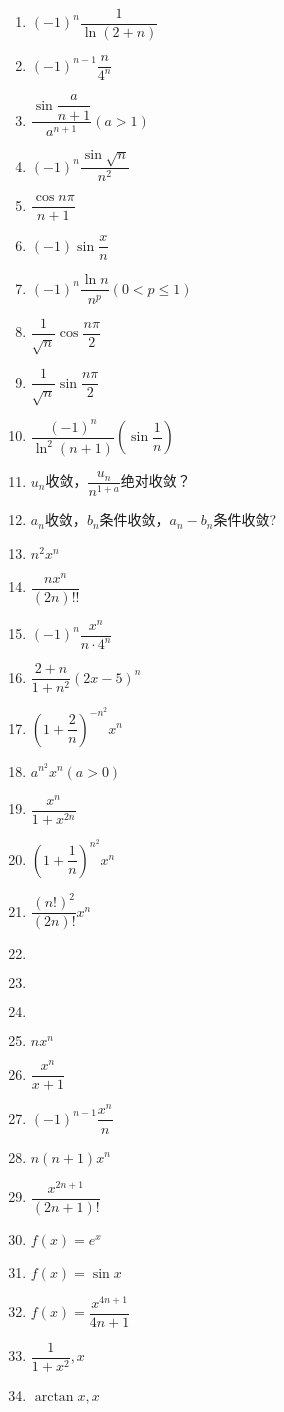 \documentclass[UTF8,a4paper,12pt,scheme=chinese]{ctexart}
\begin{document}
\begin{enumerate}
	\item 	$ (-1)^n\dfrac{1}{\ln(2+n)} $
	\item 	$ (-1)^{n-1}\dfrac{n}{4^n} $
	\item 	$ \dfrac{\sin\dfrac{a}{n+1}}{a^{n+1}}(a>1) $
	\item 	$ (-1)^n\dfrac{\sin\sqrt{n}}{n^2} $
	\item 	$ \dfrac{\cos n \pi}{n+1} $
	\item 	$ (-1)\sin\dfrac{x}{n} $
	\item 	$ (-1)^n\dfrac{\ln n}{n^p}(0<p\leq1) $
	\item 	$ \dfrac{1}{\sqrt{n}}\cos\dfrac{n\pi}{2} $
	\item 	$ \dfrac{1}{\sqrt{n}}\sin\dfrac{n\pi}{2} $
	\item 	$ \dfrac{(-1)^n}{\ln^2(n+1)}(\sin\dfrac{1}{n}) $
	\item 	$ u_n $收敛，$ \dfrac{u_n}{n^{1+a}} $绝对收敛？
	\item 	$ a_n $收敛，$ b_n $条件收敛，$ a_n-b_n $条件收敛?
	\item 	$ n^2x^n $
	\item 	$ \dfrac{nx^n}{(2n)!!} $
	\item 	$ (-1)^n\dfrac{x^n}{n\cdot4^n} $
	\item 	$ \dfrac{2+n}{1+n^2}(2x-5)^n $
	\item 	$ (1+\dfrac{2}{n})^{-n^2}x^n $
	\item 	$ a^{n^2}x^n(a>0) $
	\item 	$ \dfrac{x^n}{1+x^{2n}} $
	\item 	$ (1+\dfrac{1}{n})^{n^2}x^n $
	\item	$ \dfrac{(n!)^2}{(2n)!}x^n $
	\item 	$  $
	\item 	$  $
	\item 	$  $
	\item 	$ nx^n $
	\item 	$ \dfrac{x^n}{x+1} $
	\item 	$ (-1)^{n-1}\dfrac{x^n}{n} $
	\item 	$ n(n+1)x^n $
	\item 	$ \dfrac{x^{2n+1}}{(2n+1)!} $
	\item 	$ f(x)=e^x $
	\item 	$ f(x)=\sin x $
	\item 	$ f(x)=\dfrac{x^{4n+1}}{4n+1} $
	\item 	$ \dfrac{1}{1+x^2},x $
	\item 	$ \arctan x,x $

\end{enumerate}
\end{document}
